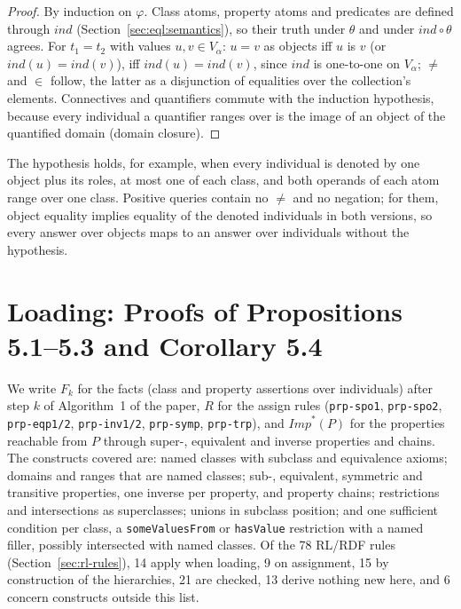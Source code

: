 \begin{proof}
By induction on $\varphi$. Class atoms, property atoms and predicates are defined through
$\mathit{ind}$ (Section~\ref{sec:eql:semantics}), so their truth under $\theta$ and under
$\mathit{ind}\circ\theta$ agrees. For $t_1=t_2$ with values $u,v\in V_\alpha$: $u=v$ as objects
iff $u$ is $v$ (or $\mathit{ind}(u)=\mathit{ind}(v)$), iff $\mathit{ind}(u)=\mathit{ind}(v)$, since
$\mathit{ind}$ is one-to-one on $V_\alpha$; $\neq$ and $\in$ follow, the latter as a disjunction
of equalities over the collection's elements. Connectives and quantifiers commute with the
induction hypothesis, because every individual a quantifier ranges over is the image of an object
of the quantified domain (domain closure).
\end{proof}

The hypothesis holds, for example, when every individual is denoted by one object plus its roles,
at most one of each class, and both operands of each atom range over one class. Positive queries
contain no $\neq$ and no negation; for them, object equality implies equality of the denoted
individuals in both versions, so every answer over objects maps to an answer over individuals
without the hypothesis.

\section{Loading: Proofs of Propositions 5.1--5.3 and Corollary 5.4}
\label{sec:loading-proofs}

We write $F_k$ for the facts (class and property assertions over individuals) after step $k$ of
Algorithm~1 of the paper, $R$ for the assign rules (\texttt{prp-spo1}, \texttt{prp-spo2},
\texttt{prp-eqp1/2}, \texttt{prp-inv1/2}, \texttt{prp-symp}, \texttt{prp-trp}), and
$\mathit{Imp}^*(P)$ for the properties reachable from $P$ through super-, equivalent and inverse
properties and chains. The constructs covered are: named classes with subclass and equivalence
axioms; domains and ranges that are named classes; sub-, equivalent, symmetric and transitive
properties, one inverse per property, and property chains; restrictions and intersections as
superclasses; unions in subclass position; and one sufficient condition per class, a
\texttt{someValuesFrom} or \texttt{hasValue} restriction with a named filler, possibly intersected
with named classes. Of the 78 RL/RDF rules (Section~\ref{sec:rl-rules}), 14 apply when loading, 9
on assignment, 15 by construction of the hierarchies, 21 are checked, 13 derive nothing new here,
and 6 concern constructs outside this list.

